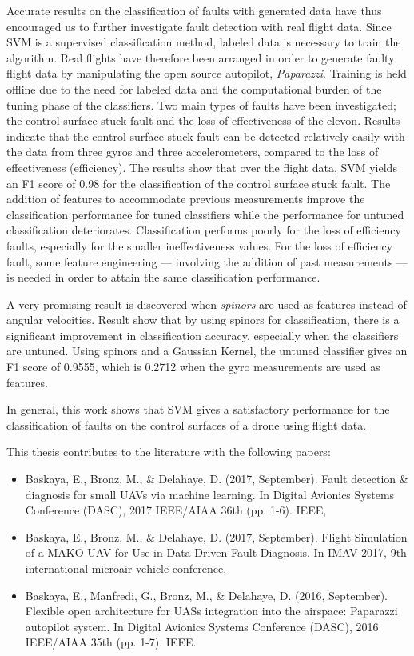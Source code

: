 Accurate results on the classification of faults with generated data have thus encouraged us to further investigate fault detection with real flight data. 
Since SVM is a supervised classification method, labeled data is necessary to train the algorithm. Real flights have therefore been arranged in order to generate faulty flight data by manipulating the open source autopilot, \emph{Paparazzi}.  
Training is held offline due to the need for labeled data and the computational burden of the tuning phase of the classifiers. 
Two main types of faults have been investigated; the control surface stuck fault and the loss of effectiveness of the elevon. Results indicate that the control surface stuck fault can be detected relatively easily with the data from three gyros and three accelerometers, compared to the loss of effectiveness (efficiency). 
The results show that over the flight data, SVM yields an F1 score of 0.98 for the classification of the control surface stuck fault. 
The addition of features to accommodate previous measurements improve the classification performance for tuned classifiers while the performance for untuned classification deteriorates. 
Classification performs poorly for the loss of efficiency faults, especially for the smaller ineffectiveness values. 
For the loss of efficiency fault, some feature engineering --- involving the addition of past measurements --- is needed in order to attain the same classification performance.

A very promising result is discovered when \emph{spinors} are used as features instead of angular velocities. 
Result show that by using spinors for classification, there is a significant improvement in classification accuracy, especially when the classifiers are untuned. Using spinors and a Gaussian Kernel, the untuned classifier gives an F1 score of 0.9555, which is 0.2712 when the gyro measurements are used as features.

In general, this work shows that SVM gives a satisfactory performance for the classification of faults on the control surfaces of a drone using flight data.

This thesis contributes to the literature with the following papers: 

\begin{itemize}
\item{Baskaya, E., Bronz, M., \& Delahaye, D. (2017, September). Fault detection \& diagnosis for small UAVs via machine learning. In Digital Avionics Systems Conference (DASC), 2017 IEEE/AIAA 36th (pp. 1-6). IEEE,}
\item{Baskaya, E., Bronz, M., \& Delahaye, D. (2017, September). Flight Simulation of a MAKO UAV for Use in Data-Driven Fault Diagnosis. In IMAV 2017, 9th international microair vehicle conference,}
\item{Baskaya, E., Manfredi, G., Bronz, M., \& Delahaye, D. (2016, September). Flexible open architecture for UASs integration into the airspace: Paparazzi autopilot system. In Digital Avionics Systems Conference (DASC), 2016 IEEE/AIAA 35th (pp. 1-7). IEEE.}
\end{itemize}


